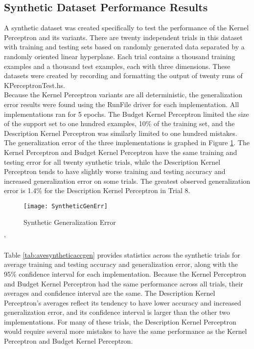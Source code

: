 \subsection{Synthetic Dataset Performance Results}\label{SyntheticResults}
A synthetic dataset was created specifically to test the performance of the Kernel Perceptron and its variants. There are twenty independent trials in this dataset with training and testing sets based on randomly generated data separated by a randomly oriented linear hyperplane. Each trial contains a thousand training examples and a thousand test examples, each with three dimensions. These datasets were created by recording and formatting the output of twenty runs of KPerceptronTest.hs. 
\\Because the Kernel Perceptron variants are all deterministic, the generalization error results were found using the RunFile driver for each implementation. All implementations ran for 5 epochs. The Budget Kernel Perceptron limited the size of the support set to one hundred examples, 10\% of the training set, and the Description Kernel Perceptron was similarly limited to one hundred mistakes. 
\\The generalization error of the three implementations is graphed in Figure \ref{SyntheticGenErrFig}. The Kernel Perceptron and Budget Kernel Perceptron have the same training and testing error for all twenty synthetic trials, while the Description Kernel Perceptron tends to have slightly worse training and testing accuracy and increased generalization error on some trials. The greatest observed generalization error is 1.4\% for the Description Kernel Perceptron in Trial 8.

\begin{figure}[h]\label{SyntheticGenErrFig}
 \caption{Synthetic Generalization Error}
 \texttt{[image: SyntheticGenErr]}
\end{figure}'

Table \ref{tab:avesyntheticaccgen} provides statistics across the synthetic trials for average training and testing accuracy and generalization error, along with the 95\% confidence interval for each implementation. Because the Kernel Perceptron and Budget Kernel Perceptron had the same performance across all trials, their averages and confidence interval are the same. The Description Kernel Perceptron's averages reflect its tendency to have lower accuracy and increased generalization error, and its confidence interval is larger than the other two implementations. For many of these trials, the Description Kernel Perceptron would require several more mistakes to have the same performance as the Kernel Perceptron and Budget Kernel Perceptron.

